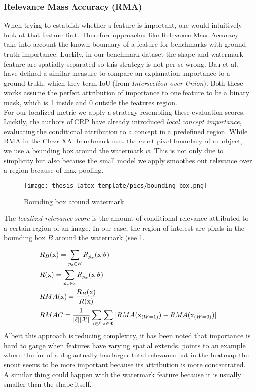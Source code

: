 \subsubsection{Relevance Mass Accuracy (RMA)}
When trying to establish whether a feature is important, one would intuitively look at that feature first. Therefore approaches like Relevance Mass Accuracy take into account the known boundary of a feature for benchmarks with ground-truth importance. Luckily, in our benchmark dataset the shape and watermark feature are spatially separated so this strategy is not per-se wrong.
Bau et al. \cite{Bau2017, Bau2020} have defined a similar measure to compare an explanation importance to a ground truth, which they term IoU (from \textit{Intersection over Union}). Both these works assume the perfect attribution of importance to one feature to be a binary mask, which is 1 inside and 0 outside the features region. \\

For our localized metric we apply a strategy resembling these evaluation scores. 
Luckily, the authors of CRP have already introduced \textit{local concept importance}, evaluating the conditional attribution to a concept in a predefined region. 
While RMA in the Clevr-XAI benchmark uses the exact pixel-boundary of an object, we use a bounding box around the watermark \textit{w}. This is not only due to simplicity but also because the small model we apply smoothes out relevance over a region because of max-pooling. \\

\begin{figure}
    \centering
    \texttt{[image: thesis\_latex\_template/pics/bounding\_box.png]}
    \caption{Bounding box around watermark}
    \label{fig:bounding_box}
\end{figure}

The \textit{localized relevance score} is the amount of conditional relevance attributed to a certain region of an image. In our case, the region of interest are pixels in the bounding box $B$ around the watermark (see \cref{fig:bounding_box}. 

\begin{align*}
\displaystyle
& R_B(\mathrm{x}) = \sum_{p_x \in B} R_{p_x}(\mathrm{x} | \theta)\\
& R(\mathrm{x}) = \sum_{p_x \in x} R_{p_x}(\mathrm{x} | \theta) \\
& RMA(\mathrm{x}) = \frac{R_B(\mathrm{x})}{R(\mathrm{x})} \\
& RMAC =\frac{1}{|\ell| |\mathcal{X}|} \sum_{i \in \ell} \sum_{\mathrm{x} \in \mathcal{X}} |RMA(\mathrm{x}_{(W=1)}) - RMA(\mathrm{x}_{(W=0)})|
\end{align*}
Albeit this approach is reducing complexity, it has been noted that importance is hard to gauge when features have varying spatial extends. \cite{Achtibat2022} points to an example where the fur of a dog actually has larger total relevance but in the heatmap the snout seems to be more important because its attribution is more concentrated. A similar thing could happen with the watermark feature because it is usually smaller than the shape itself. 

